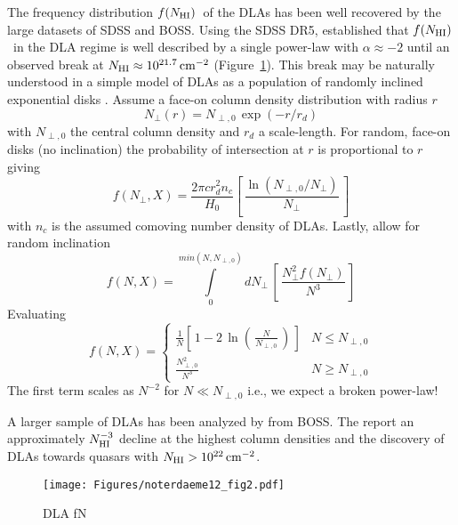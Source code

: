 \documentclass[graybox]{svmult}
\def\ltk{\left [ \,}
\def\ltp{\left ( \,}
\def\rtk{\, \right  ] }
\def\rtp{\, \right  ) }
\def\intl{\int\limits}
\newcommand{\mnhi}{N_{\rm HI}}
\def\cm#1{\, {\rm cm^{#1}}}
\def\mfnhi{f(\mnhi)}
\def\fnhi{$\mfnhi$}
\begin{document}
The frequency distribution \fnhi\ of the DLAs has been well
recovered by the large datasets of SDSS and BOSS.  Using
the SDSS DR5, \cite{phw05} established that \fnhi\ in the DLA
regime is well described by a single power-law with $\alpha \approx -2$
until an observed break at $\mnhi \approx 10^{21.7} \cm{-2}$
(Figure~\ref{fig:phw05_fN}).
This break may be naturally understood in a simple model
of DLAs as a population of randomly inclined exponential disks
\cite{fall93,wlf+95}.
Assume a face-on column density distribution with radius $r$
\begin{equation}
N_\perp (r) = N_{\perp,0} \, \exp(-r/r_d)
\end{equation}
with $N_{\perp,0}$ the central column density and $r_d$ a scale-length.
For random, face-on disks (no inclination) the probability
of intersection at $r$ is proportional to $r$ giving
\begin{equation}
f(N_\perp,X) = \frac{2 \pi c r_d^2 n_c}{H_0} \ltk \frac{\ln (N_{\perp,0}/N_\perp)}{N_\perp} \rtk
\end{equation}
with  $n_c$ is the assumed comoving number density of DLAs.
Lastly, allow for random inclination
\begin{equation}
f(N,X) = \intl_0^{min(N,N_{\perp,0})} dN_\perp \, \ltk \frac{N_\perp^2 f(N_\perp)}{N^3} \rtk
\end{equation}
Evaluating 
\begin{equation}
f(N,X) = 
        \begin{cases}
        \frac{1}{N} \ltk 1 - 2 \, \ln \ltp \frac{N}{N_{\perp,0}} \rtp \rtk & N \le N_{\perp, 0} \\
        \frac{N_{\perp,0}^2}{N^3} & N \ge N_{\perp,0}
        \end{cases}
      \end{equation}
The first term scales as $N^{-2}$ for $N \ll N_{\perp,0}$
i.e., we expect a broken power-law!

A larger sample of DLAs has been analyzed by \cite{noterdaeme+12}
from BOSS.
The report an approximately $\mnhi^{-3}$ decline at the highest column 
densities and the
discovery of DLAs towards quasars 
with $\mnhi > 10^{22} \cm{-2}$.


%
\begin{figure}[b]
\sidecaption
\texttt{[image: Figures/noterdaeme12\_fig2.pdf]}
%
%
\caption{DLA fN
}
\label{fig:phw05_fN}       %
\end{figure}
\end{document}
